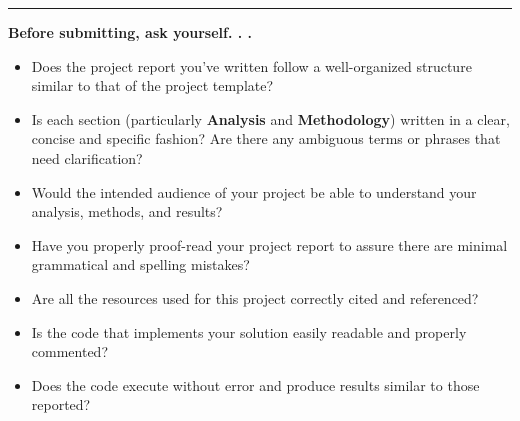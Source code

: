 \documentclass[]{article}
\begin{document}
\begin{center}\rule{3in}{0.4pt}\end{center}

\textbf{Before submitting, ask yourself. . .}

\begin{itemize}
\itemsep1pt\parskip0pt
\item
  Does the project report you've written follow a well-organized
  structure similar to that of the project template?
\item
  Is each section (particularly \textbf{Analysis} and \textbf{Methodology}) written in a clear, concise and specific
  fashion? Are there any ambiguous terms or phrases that need   clarification?
\item
  Would the intended audience of your project be able to understand your analysis, methods, and results?
\item
  Have you properly proof-read your project report to assure there are minimal grammatical and spelling mistakes?
\item
  Are all the resources used for this project correctly cited and
  referenced?
\item
  Is the code that implements your solution easily readable and properly commented?
\item
  Does the code execute without error and produce results similar to
  those reported?
\end{itemize}
\end{document}
